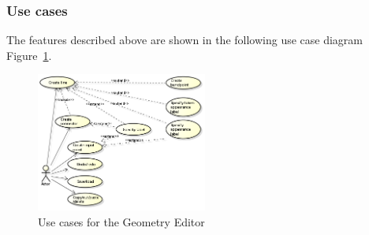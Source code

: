 \subsubsection{Use cases}

The features described above are shown in the following use case diagram  Figure~\ref{fig:use-cases-geometry-editor}.

\begin{figure}[hp]
\begin{center}
  \includegraphics[width=0.5\textwidth]{image/uc-geometry.png}
  \caption{Use cases for the Geometry Editor }
  \label{fig:use-cases-geometry-editor}
\end{center}
\end{figure}